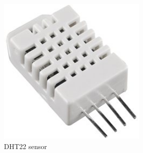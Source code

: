 \documentclass[12pt, a4paper,twoside]{tesi_upf}
\begin{document}
      \begin{figure}
        \centering
        \begin{subfigure}[b]{0.3\textwidth}
                \includegraphics[width=0.8\textwidth]{./Figures/dht22.jpg}
                \caption{DHT22 sensor}
                \label{fig:DHT22}
        \end{subfigure}%
        ~ %
        \begin{subfigure}[b]{0.3\textwidth}

\end{subfigure}
\end{figure}
\end{document}
